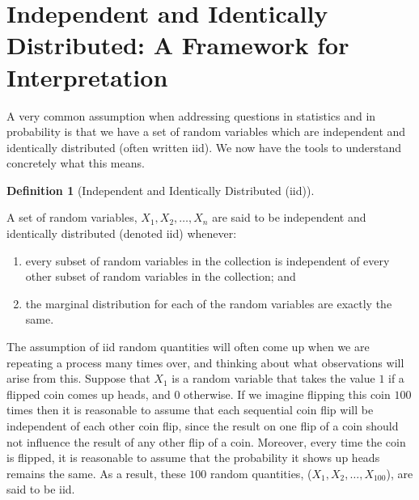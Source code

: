 \documentclass[
  letterpaper,
  DIV=11,
  numbers=noendperiod]{scrreprt}
\providecommand{\tightlist}{%
  \setlength{\itemsep}{0pt}\setlength{\parskip}{0pt}}\usepackage{longtable,booktabs,array}
\theoremstyle{definition}
\newtheorem{definition}{Definition}[chapter]
\theoremstyle{definition}
\theoremstyle{definition}
\theoremstyle{remark}
\begin{document}
\section{Independent and Identically Distributed: A Framework for
Interpretation}\label{independent-and-identically-distributed-a-framework-for-interpretation}

A very common assumption when addressing questions in statistics and in
probability is that we have a set of random variables which are
independent and identically distributed (often written iid). We now have
the tools to understand concretely what this means.

\begin{definition}[Independent and Identically Distributed
(iid)]\protect\hypertarget{def-iid}{}\label{def-iid}

A set of random variables, \(X_1,X_2,\dots,X_n\) are said to be
independent and identically distributed (denoted iid) whenever:

\begin{enumerate}
\def\labelenumi{\roman{enumi}.}
\tightlist
\item
  every subset of random variables in the collection is independent of
  every other subset of random variables in the collection; and
\item
  the marginal distribution for each of the random variables are exactly
  the same.
\end{enumerate}

\end{definition}

The assumption of iid random quantities will often come up when we are
repeating a process many times over, and thinking about what
observations will arise from this. Suppose that \(X_1\) is a random
variable that takes the value \(1\) if a flipped coin comes up heads,
and \(0\) otherwise. If we imagine flipping this coin \(100\) times then
it is reasonable to assume that each sequential coin flip will be
independent of each other coin flip, since the result on one flip of a
coin should not influence the result of any other flip of a coin.
Moreover, every time the coin is flipped, it is reasonable to assume
that the probability it shows up heads remains the same. As a result,
these \(100\) random quantities, (\(X_1, X_2, \dots, X_{100}\)), are
said to be iid.
\end{document}
